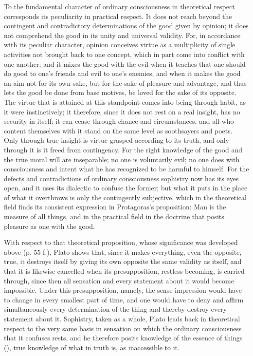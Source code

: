 To the fundamental character of ordinary consciousness in theoretical
respect corresponds its peculiarity in practical respect. It does
not reach beyond the contingent and contradictory determinations
of the good given by opinion; it does not comprehend the good in its unity and universal validity. For, in accordance with its peculiar character, opinion conceives virtue as a multiplicity of single activities not brought back to one
concept, which in part come into conflict
with one another; and it mixes the good with the evil when
it teaches that one should do good to one's friends and evil to one's enemies,
and when it makes the good an aim not for its
own sake, but for the sake of pleasure and advantage, and thus
lets the good be done from base motives, be loved for the sake of its
opposite. The virtue that is attained at this
standpoint comes into being through habit, as it were instinctively; it
therefore, since it does not rest on a real insight, has
no security in itself; it can cease through chance and
circumstances, and all who content themselves with it stand on the
same level as soothsayers and poets. Only through true
insight is virtue grasped according to its truth, and only through
it is it freed from contingency. For the right knowledge of the good and the true moral will are inseparable; no one is voluntarily evil; no one does with consciousness and
intent what he has recognized to be harmful to himself.
For the defects and contradictions of ordinary consciousness
sophistry now has its eyes open, and it uses its dialectic
to confuse the former; but what it puts in the place of what it
overthrows is only the contingently subjective, which in the theoretical field finds its consistent expression in Protagoras's
proposition: Man is the measure of all things, and in the practical field in the
doctrine that posits pleasure as one with the good.

With respect to that theoretical proposition, whose significance
was developed above (p. 55 f.), Plato shows that, since it
makes everything, even the opposite, true, it destroys itself by
giving its own opposite the same validity as itself, and
that it is likewise cancelled when its presupposition, restless
becoming, is carried through, since then all sensation and every statement about it would become impossible. Under this presupposition,
namely, the sense-impression would have to change in every smallest part of time,
and one would have to deny and affirm simultaneously every determination of the thing and thereby destroy every statement about
it. Sophistry, taken as a whole, Plato leads back in theoretical respect to the very same basis in sensation
on which the ordinary consciousness that it confuses
rests, and he therefore posits knowledge of the essence of things
(), true knowledge of what in truth is, as
inaccessible to it.


